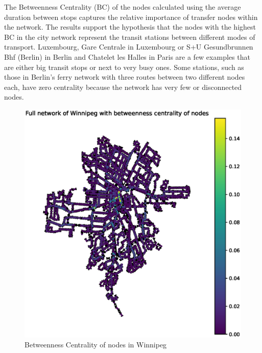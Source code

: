 \documentclass{article}
\theoremstyle{plain}
\theoremstyle{definition}
\theoremstyle{remark}
\begin{document}
The Betweenness Centrality (BC) of the nodes calculated using the average duration between stops captures the relative importance of transfer nodes within the network. The results support the hypothesis that the nodes with the highest BC in the city network represent the transit stations between different modes of transport. Luxembourg, Gare Centrale in Luxembourg or S+U Gesundbrunnen Bhf (Berlin) in Berlin and Chatelet les Halles in Paris are a few examples that are either big transit stops or next to very busy ones. Some stations, such as those in Berlin's ferry network with three routes between two different nodes each, have zero centrality because the network has very few or disconnected nodes. 
\begin{figure}[ht]
\vskip -0.1in
\begin{center}
\centerline{\includegraphics[width=\columnwidth]{images/winnipeg_BC.eps}}
\caption{Betweenness Centrality of nodes in Winnipeg}
\label{BC-winni}
\end{center}
\vskip -0.3in
\end{figure} 
\end{document}
